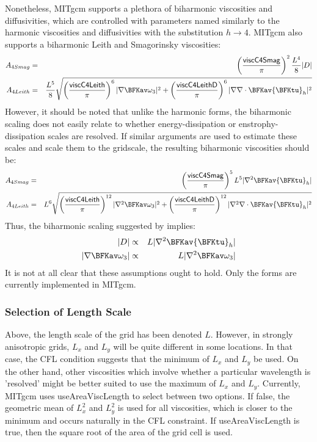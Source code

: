 Nonetheless, MITgcm supports a plethora of biharmonic viscosities
and diffusivities, which are controlled with parameters named
similarly to the harmonic viscosities and diffusivities with the
substitution $h\rightarrow 4$.  MITgcm also supports a biharmonic
Leith and Smagorinsky viscosities:
\begin{eqnarray}
A_{4Smag} & = & 
\left(\frac{{\sf viscC4Smag}}{\pi}\right)^2\frac{L^4}{8}|D| \\
A_{4Leith} & = & 
\frac{L^5}{8}\sqrt{\left(\frac{{\sf viscC4Leith}}{\pi}\right)^6
  |\nabla \BFKav \omega_3|^2
  +\left(\frac{{\sf viscC4LeithD}}{\pi}\right)^6
  |\nabla \nabla\cdot \BFKav {\bf \BFKtu}_h|^2}
\end{eqnarray}
However, it should be noted that unlike the harmonic forms, the
biharmonic scaling does not easily relate to whether
energy-dissipation or enstrophy-dissipation scales are resolved.  If
similar arguments are used to estimate these scales and scale them to
the gridscale, the resulting biharmonic viscosities should be:
\begin{eqnarray}
A_{4Smag} & = & 
\left(\frac{{\sf viscC4Smag}}{\pi}\right)^5L^5
|\nabla^2\BFKav {\bf \BFKtu}_h| \\
A_{4Leith} & = & 
L^6\sqrt{\left(\frac{{\sf viscC4Leith}}{\pi}\right)^{12}
  |\nabla^2 \BFKav \omega_3|^2
  +\left(\frac{{\sf viscC4LeithD}}{\pi}\right)^{12}
  |\nabla^2 \nabla\cdot \BFKav {\bf \BFKtu}_h|^2}
\end{eqnarray}
Thus, the biharmonic scaling suggested by \cite{griffies:00} implies:
\begin{eqnarray}
|D| & \propto &  L|\nabla^2\BFKav {\bf \BFKtu}_h|\\
|\nabla \BFKav \omega_3| & \propto & L|\nabla^2 \BFKav \omega_3|
\end{eqnarray}
It is not at all clear that these assumptions ought to hold.  Only the
\cite{griffies:00} forms are currently implemented in MITgcm.

\subsubsection{Selection of Length Scale}
Above, the length scale of the grid has been denoted $L$.  However, in
strongly anisotropic grids, $L_x$ and $L_y$ will be quite different in
some locations.  In that case, the CFL condition suggests that the
minimum of $L_x$ and $L_y$ be used.  On the other hand, other
viscosities which involve whether a particular wavelength is
'resolved' might be better suited to use the maximum of $L_x$ and
$L_y$.  Currently, MITgcm uses {\sf useAreaViscLength} to select
between two options.  If false, the geometric mean of $L^2_x$ and
$L^2_y$ is used for all viscosities, which is closer to the minimum
and occurs naturally in the CFL constraint.  If {\sf
  useAreaViscLength} is true, then the square root of the area of the
grid cell is used.

